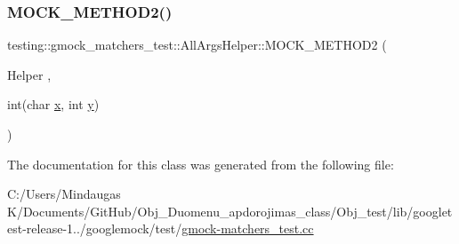 \subsubsection{\texorpdfstring{MOCK\_METHOD2()}{MOCK\_METHOD2()}}
{\footnotesize\ttfamily testing\+::gmock\+\_\+matchers\+\_\+test\+::\+All\+Args\+Helper\+::\+M\+O\+C\+K\+\_\+\+M\+E\+T\+H\+O\+D2 (\begin{DoxyParamCaption}\item[{Helper}]{,  }\item[{int(char \mbox{\hyperlink{_obj__test_2lib_2googletest-master_2googlemock_2test_2gmock-matchers__test_8cc_a6150e0515f7202e2fb518f7206ed97dc}{x}}, int \mbox{\hyperlink{_obj__test_2lib_2googletest-master_2googlemock_2test_2gmock-matchers__test_8cc_a39cb44155237f0205e0feb931d5acbed}{y}})}]{ }\end{DoxyParamCaption})}



The documentation for this class was generated from the following file\+:\begin{DoxyCompactItemize}
\item 
C\+:/\+Users/\+Mindaugas K/\+Documents/\+Git\+Hub/\+Obj\+\_\+\+Duomenu\+\_\+apdorojimas\+\_\+class/\+Obj\+\_\+test/lib/googletest-\/release-\/1../googlemock/test/\mbox{\hyperlink{_obj__test_2lib_2googletest-release-1_88_81_2googlemock_2test_2gmock-matchers__test_8cc}{gmock-\/matchers\+\_\+test.\+cc}}\end{DoxyCompactItemize}

